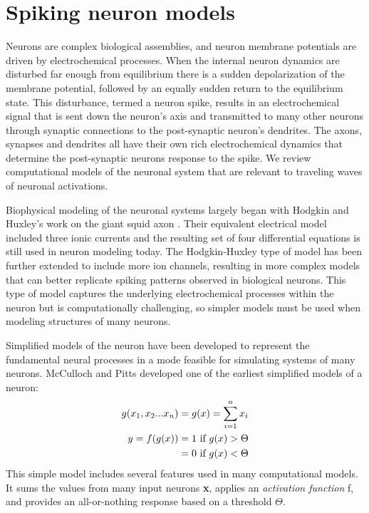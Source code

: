 \section{Spiking neuron models}
Neurons are complex biological assemblies, and neuron membrane potentials are driven by electrochemical processes.
When the internal neuron dynamics are disturbed far enough from equilibrium there is a sudden depolarization of the membrane potential, followed by an equally sudden return to the equilibrium state.
This disturbance, termed a neuron spike, results in an electrochemical signal that is sent down the neuron's axis and transmitted to many other neurons through synaptic connections to the post-synaptic neuron's dendrites.
The axons, synapses and dendrites all have their own rich electrochemical dynamics that determine the post-synaptic neurons response to the spike.
We review computational models of the neuronal system that are relevant to traveling waves of neuronal activations.

Biophysical modeling of the neuronal systems largely began with Hodgkin and Huxley's work on the giant squid axon \citep{Hodgkin1952}.
Their equivalent electrical model included three ionic currents and the resulting set of four differential equations is still used in neuron modeling today.
The Hodgkin-Huxley type of model has been further extended to include more ion channels\citep{Wilson1999}, resulting in more complex models that can better replicate spiking patterns observed in biological neurons.
This type of model captures the underlying electrochemical processes within the neuron but is computationally challenging, so simpler models must be used when modeling structures of many neurons.

Simplified models of the neuron have been developed to represent the fundamental neural processes in a mode feasible for simulating systems of many neurons.
McCulloch and Pitts\citep{McCulloch1943} developed one of the earliest simplified models of a neuron:
\begin{align}
  \begin{split}
    g(x_1,x_2...x_n) &= g(\boldmath{x})=\sum_{i=1}^n x_i \\
    y = f(g(x)) &= 1 \text{ if } g(x)>\Theta \\
		&= 0 \text{ if } g(x)<\Theta \\
  \end{split}
\end{align}
This simple model includes several features used in many computational models.
It sums the values from many input neurons \textbf{x}, applies an \textit{activation function} f, and provides an all-or-nothing response based on a threshold $\Theta$.

